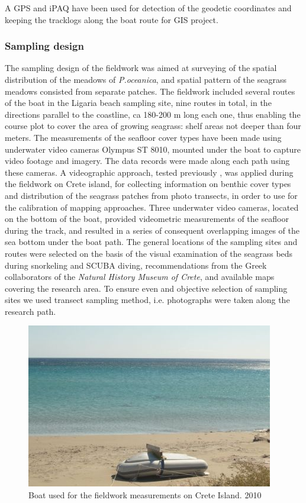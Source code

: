 \documentclass[10pt, a4paper]{article}
\begin{document}
A GPS and iPAQ have been used for detection of the geodetic coordinates and keeping the tracklogs
along the boat route for GIS project.

\subsubsection{Sampling design}
The sampling design of the fieldwork was aimed at surveying of the spatial distribution of the
meadows of \textit{P.oceanica}, and spatial pattern of the seagrass meadows consisted from separate
patches. The fieldwork included several routes of the boat in the Ligaria beach sampling site, nine
routes in total, in the directions parallel to the coastline, ca 180-200 m long each one, thus enabling the
course plot to cover the area of growing seagrass: shelf areas not deeper than four meters.
The measurements of the seafloor cover types have been made using underwater video cameras
Olympus ST 8010, mounted under the boat to capture video footage and imagery. The data records
were made along each path using these cameras. A videographic approach, tested previously \cite{Norris97}\label{Norris97},
 was applied during the fieldwork on Crete island, for collecting information on benthic cover types and
distribution of the seagrass patches from photo transects, in order to use for the calibration of mapping approaches.
Three underwater video cameras, located on the bottom of the boat, provided videometric measurements of the
seafloor during the track, and resulted in a series of consequent overlapping images of the sea bottom under the
boat path. The general locations of the sampling sites and routes were selected on the basis of the visual examination
of the seagrass beds during snorkeling and SCUBA diving, recommendations from the Greek collaborators of the \textit{Natural History Museum of Crete}, and available maps covering the research area. To ensure even and objective selection of sampling sites
we used transect sampling method, i.e. photographs were taken along the research path. 

\begin{figure}[H]
	\centering
	\includegraphics[scale=0.70]{Fig-18.jpg}
	\caption{Boat used for the fieldwork measurements on Crete Island. 2010}
	\label{fig:3.4}
\end{figure}
\end{document}
